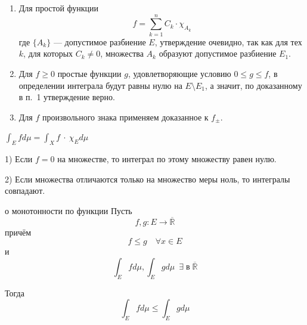 \documentclass[12pt,a4paper]{article}
\begin{document}
\begin{proofbox}{}
    \begin{enumerate}
        \item Для простой функции
        \[
            f = \sum_{k=1}^{n} C_k \cdot \chi_{A_k}
        \]
        где $\{A_k\}$ --- допустимое разбиение $E$,
        утверждение очевидно, так как для тех $k$, для которых
        $C_k \neq 0$, множества $A_k$ образуют допустимое
        разбиение $E_1$.

        \item Для $f \geqslant 0$ простые функции
        $g$, удовлетворяющие условию $0 \leqslant g \leqslant f$,
        в определении интеграла будут равны нулю на
        $E \setminus E_1$, а значит, по доказанному в п.~1
        утверждение верно.

        \item Для $f$ произвольного знака применяем
        доказанное к $f_{\pm}$.
    \end{enumerate}
\end{proofbox}

\begin{corollary}
    $\int_E fd\mu = \int_X f\:\cdot\:\chi_Ed\mu$
\end{corollary}

\begin{props}{}

    1) Если $f=0$ на множестве, то интеграл по этому множеству равен нулю.

    2) Если множества отличаются только на множество меры ноль, то интегралы совпадают.
\end{props}

\begin{theorem}{о монотонности по функции}
    Пусть
    \[
        f,g:E\to\overline{\mathbb{R}}
    \]
    причём
    \[
        f\leq g\quad \forall x\in E
    \]
    и
    \[
        \int_E f d\mu, \int_E g d\mu \;\: \exists\; \text{в} \; \overline{\mathbb{R}}
    \]

    Тогда
    \[
        \int_E f d\mu\leq\int_E g d\mu
    \]
\end{theorem}
\end{document}
